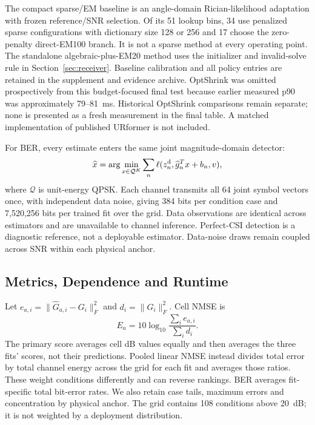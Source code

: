 The compact sparse/EM baseline is an angle-domain Rician-likelihood adaptation with frozen reference/SNR selection. Of its 51 lookup bins, 34 use penalized sparse configurations with dictionary size 128 or 256 and 17 choose the zero-penalty direct-EM100 branch. It is not a sparse method at every operating point. The standalone algebraic-plus-EM20 method uses the initializer and invalid-solve rule in Section~\ref{sec:receiver}. Baseline calibration and all policy entries are retained in the supplement and evidence archive. OptShrink was omitted prospectively from this budget-focused final test because earlier measured p90 was approximately 79--81~ms. Historical OptShrink comparisons remain separate; none is presented as a fresh measurement in the final table. A matched implementation of published URformer is not included.

For BER, every estimate enters the same joint magnitude-domain detector:
\begin{equation}
 \widehat x=\arg\min_{x\in\mathcal Q^K}\sum_n
 \ell(z_n^{\rm d},\widehat g_n^Tx+b_n,v),
\end{equation}
where $\mathcal Q$ is unit-energy QPSK. Each channel transmits all 64 joint symbol vectors once, with independent data noise, giving 384 bits per condition case and 7,520,256 bits per trained fit over the grid. Data observations are identical across estimators and are unavailable to channel inference. Perfect-CSI detection is a diagnostic reference, not a deployable estimator. Data-noise draws remain coupled across SNR within each physical anchor.

\subsection{Metrics, Dependence and Runtime}
Let $e_{a,i}=\|\widehat G_{a,i}-G_i\|_F^2$ and $d_i=\|G_i\|_F^2$. Cell NMSE is
\begin{equation}
 E_a=10\log_{10}\frac{\sum_i e_{a,i}}{\sum_i d_i}.
 \label{eq:nmse}
\end{equation}
The primary score averages cell dB values equally and then averages the three fits' scores, not their predictions. Pooled linear NMSE instead divides total error by total channel energy across the grid for each fit and averages those ratios. These weight conditions differently and can reverse rankings. BER averages fit-specific total bit-error rates. We also retain case tails, maximum errors and concentration by physical anchor. The grid contains 108 conditions above 20~dB; it is not weighted by a deployment distribution.

